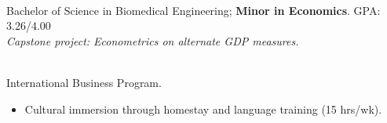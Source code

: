 \documentclass[margin]{res}
\begin{document}
\begin{sloppypar}
\begin{resume}
\\
Bachelor of Science in Biomedical Engineering; \textbf{Minor in Economics}. GPA: 3.26/4.00 \\
\textit{Capstone project: Econometrics on alternate GDP measures.}





\\
International Business Program.
    \begin{itemize}
        \item Cultural immersion through homestay and language training (15 hrs/wk). 
    \end{itemize}


\end{resume}
\end{sloppypar}
\end{document}
